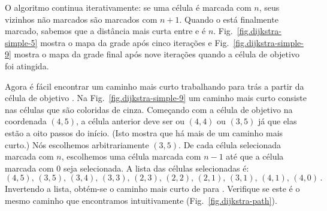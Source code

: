 {%

O algoritmo continua iterativamente: se uma célula é marcada com $n$, seus vizinhos não marcados são marcados com $n+1$. Quando o  está finalmente marcado, sabemos que a distância mais curta entre  e  é $n$. Fig.~\ref{fig.dijkstra-simple-5} mostra o mapa da grade após cinco iterações e Fig.~\ref{fig.dijkstra-simple-9} mostra o mapa da grade final após nove iterações quando a célula de objetivo foi atingida.

Agora é fácil encontrar um caminho mais curto trabalhando para trás a partir da célula de objetivo . Na Fig.~\ref{fig.dijkstra-simple-9} um caminho mais curto consiste nas células que são coloridas de cinza. Começando com a célula de objetivo na coordenada $(4,5)$, a célula anterior deve ser ou $(4,4)$ ou $(3,5)$ já que elas estão a oito passos do início. (Isto mostra que há mais de um caminho mais curto.) Nós escolhemos arbitrariamente $(3,5)$. De cada célula selecionada marcada com $n$, escolhemos uma célula marcada com $n-1$ até que a célula  marcada com $0$ seja selecionada. A lista das células selecionadas é:
\[
(4,5),\, (3,5),\, (3,4),\, (3,3),\, (2,3),\, (2,2),\, (2,1),\, (3,1),\, (4,1),\, (4,0)\,.
\]
Invertendo a lista, obtém-se o caminho mais curto de  para . Verifique se este é o mesmo caminho que encontramos intuitivamente (Fig.~\ref{fig.dijkstra-path}).

}
